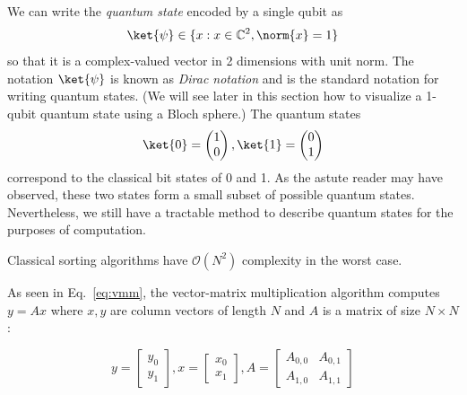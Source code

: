 We can write the \emph{quantum state} encoded by a single qubit as
\begin{equation}
    \ket{\psi} \in \{ x : x \in \mathbb{C}^2, \norm{x} = 1 \}
\end{equation}
so that it is a complex-valued vector in 2 dimensions with unit norm. The notation $\ket{\psi}$ is known as \emph{Dirac notation} and is the standard notation for writing quantum states. (We will see later in this section how to visualize a 1-qubit quantum state using a Bloch sphere.) The quantum states
\begin{equation}
\ket{0} = \begin{pmatrix}
1 \\
0
\end{pmatrix}, 
\ket{1}= \begin{pmatrix}
0 \\
1
\end{pmatrix}
\end{equation}
correspond to the classical bit states of 0 and 1. As the astute reader may have observed, these two states form a small subset of possible quantum states. Nevertheless, we still have a tractable method to describe quantum states for the purposes of computation.

Classical sorting algorithms have $\mathcal{O}(N^2)$ complexity in the worst case.

As seen in Eq.~\ref{eq:vmm}, the vector-matrix multiplication algorithm computes $y = Ax$ where $x, y$ are column vectors of length $N$ and $A$ is a matrix of size $N \times N$:

\begin{equation}
y = \begin{bmatrix}
y_0 \\
y_1
\end{bmatrix}, 
x = \begin{bmatrix}
x_0 \\
x_1
\end{bmatrix},
A = \begin{bmatrix}
A_{0,0} & A_{0,1} \\
A_{1,0} & A_{1,1} 
\end{bmatrix}
\label{eq:vmm}
\end{equation}
